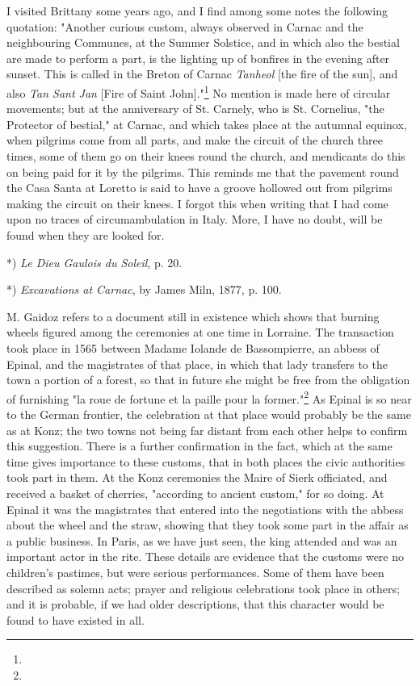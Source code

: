 \documentclass[a4paper, 11pt, oneside, polutonikogreek, english]{article}
\begin{document}
I visited Brittany some years ago, and I find among some notes the following quotation: "Another curious custom, always observed in Carnac and the neighbouring Communes, at the Summer Solstice, and in which also the bestial are made to perform a part, is the lighting up of bonfires in the evening after sunset. This is called in the Breton of Carnac \emph{Tanheol} [the fire of the sun], and also \emph{Tan Sant Jan} [Fire of Saint John]."\footnote{} No mention is made here of circular movements; but at the anniversary of St. Carnely, who is St. Cornelius, "the Protector of bestial," at Carnac, and which takes place at the autumnal equinox, when pilgrims come from all parts, and make the circuit of the church three times, some of them go on their knees round the church, and mendicants do this on being paid for it by the pilgrims. This reminds me that the pavement round the Casa Santa at Loretto is said to have a groove hollowed out from pilgrims making the circuit on their knees. I forgot this when writing that I had come upon no traces of circumambulation in Italy. More, I have no doubt, will be found when they are looked for.

*) \emph{Le Dieu Gaulois du Soleil}, p. 20.

*) \emph{Excavations at Carnac}, by James Miln, 1877, p. 100.

M. Gaidoz refers to a document still in existence which shows that burning wheels figured among the ceremonies at one time in Lorraine. The transaction took place in 1565 between Madame Iolande de Bassompierre, an abbess of Epinal, and the magistrates of that place, in which that lady transfers to the town a portion of a forest, so that in future she might be free from the obligation of furnishing "la roue de fortune et la paille pour la former."\footnote{} As Epinal is so near to the German frontier, the celebration at that place would probably be the same as at Konz; the two towns not being far distant from each other helps to confirm this suggestion. There is a further confirmation in the fact, which at the same time gives importance to these customs, that in both places the civic authorities took part in them. At the Konz ceremonies the Maire of Sierk officiated, and received a basket of cherries, "according to ancient custom," for so doing. At Epinal it was the magistrates that entered into the negotiations with the abbess about the wheel and the straw, showing that they took some part in the affair as a public business. In Paris, as we have just seen, the king attended and was an important actor in the rite. These details are evidence that the customs were no children's pastimes, but were serious performances. Some of them have been described as solemn acts; prayer and religious celebrations took place in others; and it is probable, if we had older descriptions, that this character would be found to have existed in all.
\end{document}

